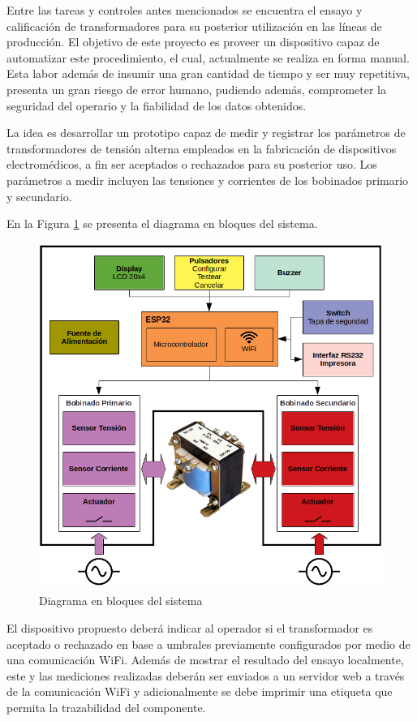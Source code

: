 \documentclass[11pt]{charter}
\begin{document}
Entre las tareas y controles antes mencionados se encuentra el ensayo y calificación de  transformadores para su posterior utilización en las líneas de producción. El objetivo de este proyecto es proveer un dispositivo capaz de automatizar este procedimiento, el cual, actualmente se realiza en forma manual. Esta labor además de insumir una gran cantidad de tiempo y ser muy repetitiva, presenta un gran riesgo de error humano, pudiendo además, comprometer la seguridad del operario y la fiabilidad de los datos obtenidos.

La idea es desarrollar un prototipo capaz de medir y registrar los parámetros de transformadores de tensión alterna empleados en la fabricación de dispositivos electromédicos, a fin ser aceptados o rechazados para su posterior uso. Los parámetros a medir incluyen las tensiones y corrientes de los bobinados primario y secundario.

En la Figura \ref{fig:diagBloques} se presenta el diagrama en bloques del sistema.

\vspace{25px}

\begin{figure}[htpb]
\centering 
\includegraphics[width=.7\textwidth]{./Figuras/diagBloques.png}
\caption{Diagrama en bloques del sistema}
\label{fig:diagBloques}
\end{figure}

\vspace{25px}


El dispositivo propuesto deberá indicar al operador si el transformador es aceptado o rechazado en base a umbrales previamente configurados por medio de una comunicación WiFi. Además de mostrar el resultado del ensayo localmente, este y las mediciones realizadas deberán ser enviados a un servidor web a través de la comunicación WiFi y adicionalmente se debe imprimir una etiqueta que permita la trazabilidad del componente.
\end{document}
